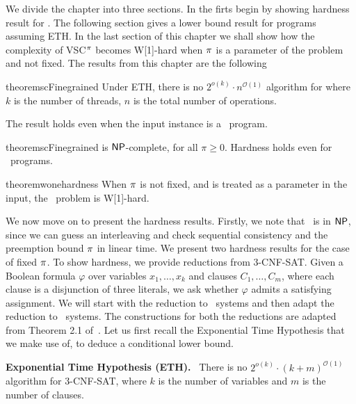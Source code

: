 We divide the chapter into three sections. In the firts  begin by showing hardness result for \twowriter{}. The following section gives a lower bound result for \threewriter{} programs assuming ETH. In the last section of this chapter we shall show how the complexity of VSC$^\pi$ becomes \textsc{W[1]}-hard when $\pi$ is a parameter of the problem and not fixed. The results from this chapter are the following

\begin{restatable}{theorem}{scFinegrained}\label{th:Finegrained}
Under ETH, there is no $2^{o(k)} \cdot n^{\mathcal{O}(1)}$ algorithm for \vscp where $k$ is the number of threads, $n$ is the total number of operations.

The result holds even when the input instance is a \threewriter\ program.
\end{restatable}

\begin{restatable}{theorem}{scFinegrained}\label{th:NPhardness}
\vscp is $\mathsf{NP}$-complete, for all $\pi \ge 0$. Hardness holds even for \twowriter\ programs. 
\end{restatable}

\begin{restatable}{theorem}{wonehardness}\label{thm:w1-hard}
When $\pi$ is not fixed, and is treated as a parameter in the input, the \vscp\ problem is W[1]-hard.
\end{restatable} 
We now move on to present the hardness results. Firstly, we note that \vscp\ is in $\mathsf{NP}$, since we can guess an interleaving and check sequential consistency and the preemption bound $\pi$ in linear time. 
We present two hardness results for the case of fixed $\pi$. To show hardness, we provide reductions from 3-CNF-SAT. Given a Boolean formula $\varphi$ over variables $x_1, \dots, x_k$ and clauses $C_1, \dots, C_m$, where each clause is a disjunction of three literals, we ask whether $\varphi$ admits a satisfying assignment. We will start with the reduction to \threewriter\ systems and then adapt the reduction to \twowriter\ systems. The constructions for both the reductions are adapted from Theorem 2.1 of~\cite{Gibbons}. Let us first recall the Exponential Time Hypothesis that we make use of, to deduce a conditional lower bound.



\textbf{Exponential Time Hypothesis (ETH).}~\cite{ImpagliazzoPZ01}
There is no $2^{o(k)}\cdot (k+m)^{\mathcal{O}(1)}$ algorithm for 3-CNF-SAT, where $k$ is the number of variables and $m$ is the number of clauses.




